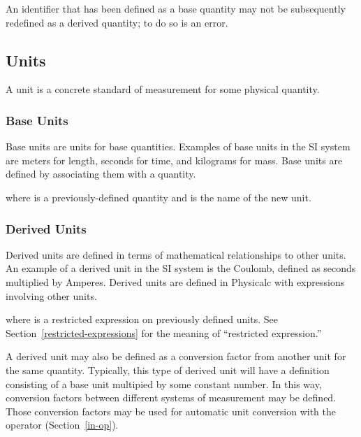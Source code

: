 An identifier that has been defined as a base quantity may not be
subsequently redefined as a derived quantity; to do so is an error.


\subsection{Units}
\label{units}

A unit is a concrete standard of measurement for some physical
quantity.


\subsubsection{Base Units}

Base units are units for base quantities.  Examples of base units in
the SI system are meters for length, seconds for time, and kilograms
for mass.\cite{base-unit} Base units are defined by associating them
with a quantity.

\begin{syntax}
   
\end{syntax}
where  is a previously-defined quantity and  is the name
of the new unit.


\subsubsection{Derived Units}

Derived units are defined in terms of mathematical relationships to
other units.  An example of a derived unit in the SI system is the
Coulomb, defined as seconds multiplied by Amperes.\cite{derived-unit}
Derived units are defined in Physicalc with expressions involving
other units.

\begin{syntax}
 \id{} \key{=} \expr{} 
\end{syntax}
where \expr{} is a restricted expression on previously defined units.
See Section~\ref{restricted-expressions} for the meaning of
``restricted expression.''

A derived unit may also be defined as a conversion factor from
another unit for the same quantity.  Typically, this type of derived
unit will have a definition \expr{} consisting of a base unit
multipied by some constant number.  In this way, conversion factors
between different systems of measurement may be defined.  Those
conversion factors may be used for automatic unit conversion with the
 operator (Section~\ref{in-op}).

